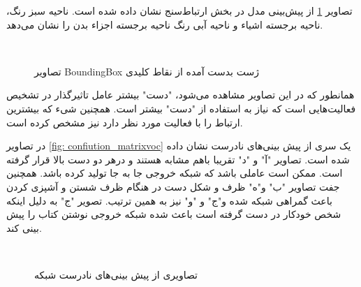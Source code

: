 تصاویر %
\ref{fig:res_for_medioum images}
 از پیش‌بینی مدل در بخش ارتباط‌سنج نشان داده شده است. ناحیه سبز رنگ، ناحیه برجسته اشیاء و ناحیه آبی رنگ ناحیه برجسته اجزاء بدن را نشان می‌دهد.
   \begin{figure}
 	\centering
 	\hfill
 	\hfill
 	\hfill
 	\\
 	\hfill
 	\hfill
 	\hfill
 	\hfill
 	\caption{تصاویر %
 		\gls{BoundingBox}
 		 ژست بدست آمده از نقاط کلیدی}
 	\label{fig:res_for_medioum images}
 \end{figure}
همانطور که در این تصاویر مشاهده می‌شود، "دست" بیشتر عامل تاثیرگذار در تشخیص فعالیت‌هایی است که نیاز به استفاده از "دست" بیشتر است. همچنین شیء که بیشترین ارتباط را با فعالیت مورد نظر دارد نیز مشخص کرده است.

در تصاویر %
\ref{fig: confiution_matrixvoc}
یک سری از پیش‌ بینی‌های نادرست نشان داده شده است. تصاویر "آ" و "د" تقریبا باهم مشابه هستند و درهر دو دست بالا قرار گرفته است. ممکن است عاملی باشد که شبکه خروجی جا به جا تولید کرده باشد. همچنین جفت تصاویر "ب" و"ه" ظرف و شکل دست در هنگام ظرف شستن و آشپزی کردن باعث گمراهی شبکه شده و"ج" و "و" نیز به همین ترتیب. تصویر "ج" به دلیل اینکه شخص خودکار در دست گرفته است باعث شده شبکه خروجی نوشتن کتاب را پیش بینی کند.
  \begin{figure}
	\centering
	\hfill
	\hfill
	\\
	\hfill
	\hfill
	\hfill
	\caption{تصاویری از پیش بینی‌های نادرست شبکه}
	\label{fig:res_for_false_prediction}
\end{figure}
 